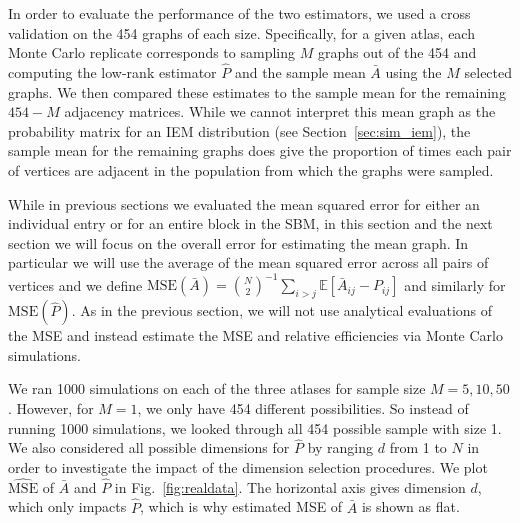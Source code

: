 \documentclass[10pt,letterpaper]{article}
\newcommand{\Ex}{\mathbb{E}}
\renewcommand{\hat}{\widehat}
\begin{document}
In order to evaluate the performance of the two estimators, we used a cross validation on the 454 graphs of each size. 
Specifically, for a given atlas, each Monte Carlo replicate corresponds to sampling $M$ graphs out of the 454 and computing the low-rank estimator $\hat{P}$ and the sample mean $\bar{A}$ using the $M$ selected graphs.
We then compared these estimates to the sample mean for the remaining $454-M$ adjacency matrices.
While we cannot interpret this mean graph as the probability matrix for an IEM distribution (see Section~\ref{sec:sim_iem}), the sample mean for the remaining graphs does give the proportion of times each pair of vertices are adjacent in the population from which the graphs were sampled.

While in previous sections we evaluated the mean squared error for either an individual entry or for an entire block in the SBM, in this section and the next section we will focus on the overall error for estimating the mean graph.
In particular we will use the average of the mean squared error across all pairs of vertices and we define $\mathrm{MSE}(\bar{A}) = \binom{N}{2}^{-1} \sum_{i>j}\Ex[\bar{A}_{ij}-P_{ij}]$ and similarly for $\mathrm{MSE}(\hat{P})$.
As in the previous section, we will not use analytical evaluations of the MSE and instead estimate the MSE and relative efficiencies via Monte Carlo simulations.

We ran 1000 simulations on each of the three atlases for sample size $M=5,10, 50$. However, for $M=1$, we only have 454 different possibilities. So instead of running 1000 simulations, we looked through all 454 possible sample with size 1.
We also considered all possible dimensions for $\hat{P}$ by ranging $d$ from 1 to $N$ in order to investigate the impact of the dimension selection procedures.
We plot $\hat{\mathrm{MSE}}$ of $\bar{A}$ and $\hat{P}$ in Fig.~\ref{fig:realdata}.
The horizontal axis gives dimension $d$, which only impacts $\hat{P}$, which is why estimated MSE of $\bar{A}$ is shown as flat.
\end{document}
